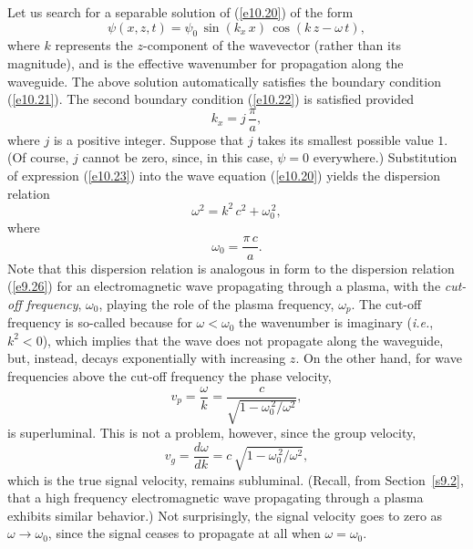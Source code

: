 Let us search for a separable solution of (\ref{e10.20})  of the form
\begin{equation}\label{e10.23}
\psi(x,z,t)= \psi_0\,\sin(k_x\,x)\,\cos(k\,z-\omega\,t),
\end{equation}
where $k$ represents the $z$-component of the wavevector (rather than its magnitude), and is the
effective wavenumber  for propagation along the waveguide.
The above solution automatically satisfies the boundary condition (\ref{e10.21}). The second boundary
condition (\ref{e10.22}) is satisfied provided
\begin{equation}
k_x = j\,\frac{\pi}{a},
\end{equation}
where $j$ is a positive integer. Suppose that $j$ takes its smallest possible value $1$.
(Of course, $j$ cannot be zero, since, in this case, $\psi=0$ everywhere.)
Substitution of expression (\ref{e10.23}) into the wave equation (\ref{e10.20}) yields the dispersion relation
\begin{equation}\label{e10.25}
\omega^2 = k^2\,c^2+\omega_0^{\,2},
\end{equation}
where
\begin{equation}
\omega_0 = \frac{\pi\,c}{a}.
\end{equation}
Note that this dispersion relation is analogous in form to the dispersion relation (\ref{e9.26})
for an electromagnetic wave propagating through a plasma, with the {\em cut-off frequency}, $\omega_0$,
playing the role of the plasma frequency, $\omega_p$. The cut-off frequency is so-called because
for $\omega<\omega_0$ the wavenumber is imaginary ({\em i.e.}, $k^2<0$), which implies that the
wave does not propagate along the waveguide, but, instead, decays exponentially with increasing $z$. 
On the other hand, for wave frequencies above the cut-off frequency the phase velocity, 
\begin{equation}
v_p = \frac{\omega}{k} = \frac{c}{\sqrt{1-\omega_0^{\,2}/\omega^2}},
\end{equation}
is superluminal. This is not a problem, however, since the group velocity, 
\begin{equation}
v_g= \frac{d\omega}{dk} = c\,\sqrt{1-\omega_0^{\,2}/\omega^2},
\end{equation}
which is the true signal velocity, remains subluminal. (Recall, from Section~\ref{s9.2}, that a high frequency electromagnetic
wave propagating through a plasma exhibits similar behavior.) 
Not surprisingly, the signal velocity
goes to zero as $\omega\rightarrow \omega_0$, since the signal ceases to
propagate at all when $\omega=\omega_0$. 

